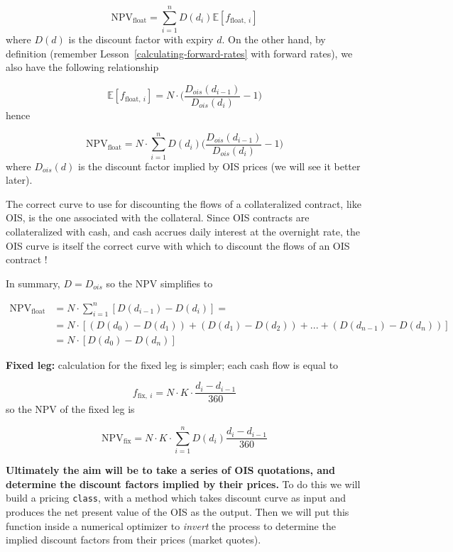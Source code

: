 \[\mathrm{NPV}_{\mathrm{float}} = \sum_{i=1}^{n}D(d_i)\mathbb{E}[f_{\mathrm{float},~i}]\]
where \(D(d)\) is the discount factor with expiry \(d\). On the other hand, by definition (remember Lesson~\ref{calculating-forward-rates} with forward rates), we also have the following relationship

\[\mathbb{E}[f_{\mathrm{float},~i}] = N\cdot\Big(\frac{D_{ois}(d_{i-1})}{D_{ois}(d_{i})} - 1\Big) \]
hence

\[\mathrm{NPV}_{\mathrm{float}} = N\cdot \sum_{i=1}^{n}D(d_i) \Big(\frac{D_{ois}(d_{i-1})}{D_{ois}(d_{i})} - 1\Big) \]
where \(D_{ois}(d)\) is the discount factor implied by OIS prices (we will see it better later).

The correct curve to use for discounting the flows of a collateralized contract, like OIS, is the one associated with the collateral. Since OIS contracts are collateralized with cash, and cash accrues daily interest
at the overnight rate, the OIS curve is itself the correct curve with which to discount the flows of an OIS contract !

In summary, \(D = D_{ois}\) so the NPV simplifies to

\begin{equation}
  \begin{split}
    \mathrm{NPV}_{\mathrm{float}} & = N\cdot\sum_{i=1}^{n}[D(d_{i-1}) - D(d_i)] =  \\
    &= N\cdot[(D(d_{0}) - D(d_{1})) + (D(d_{1}) - D(d_{2})) + ... + (D(d_{n-1}) - D(d_{n}))]\\
    &= N \cdot [D(d_0) - D(d_n)]
  \end{split}
\end{equation}

\textbf{Fixed leg:} calculation for the fixed leg is simpler; each cash flow is  equal to

\[f_{\mathrm{fix},~i}=N\cdot K\cdot \frac{d_i - d_{i-1}}{360}\]
so the NPV of the fixed leg is

\[\mathrm{NPV}_{\mathrm{fix}} = N\cdot K\cdot \sum_{i=1}^{n}D(d_{i})\frac{d_i - d_{i-1}}{360}\]

\textbf{Ultimately the aim will be to take a series of OIS quotations, and determine the discount factors implied by their prices.} To do this we will build a pricing \texttt{class}, with a method which takes discount curve as input and produces the net present value of the OIS as the output.
Then we will put this function inside a numerical optimizer to \emph{invert} the process to determine the implied discount factors from their prices (market quotes).

